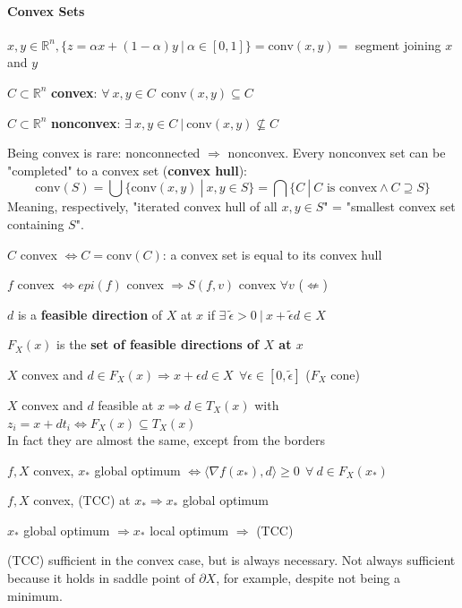 \documentclass[10pt]{report}
\begin{document}
\paragraph{Convex Sets} $x,y\in \mathbb{R}^n,\{z=\alpha x+(1-\alpha)y\:|\:\alpha\in[0,1]\} = \text{conv}(x,y) =$ segment joining $x$ and $y$
\begin{list}{}{}
	\item $C\subset \mathbb{R}^n$ \textbf{convex}: $\forall\:x,y\in C\:\:\text{conv}(x,y)\subseteq C$
	\item $C\subset \mathbb{R}^n$ \textbf{nonconvex}: $\exists\:x,y\in C\:|\:\text{conv}(x,y)\not\subseteq C$
\end{list}
Being convex is rare: nonconnected $\Rightarrow$ nonconvex. Every nonconvex set can be "completed" to a convex set (\textbf{convex hull}):
$$\text{conv}(S) = \bigcup\{\text{conv}(x,y)\:|\:x,y\in S\} = \bigcap\{C\:|\:C\text{ is convex}\wedge C\supseteq S\}$$
Meaning, respectively, "iterated convex hull of all $x,y\in S$" = "smallest convex set containing $S$".\begin{list}{}{}
	\item $C$ convex $\Leftrightarrow C = \text{conv}(C)$: a convex set is equal to its convex hull
	\item $f$ convex $\Leftrightarrow epi(f)$ convex $\Rightarrow S(f,v)$ convex $\forall v$ ($\not\Leftarrow$)
	\item $d$ is a \textbf{feasible direction} of $X$ at $x$ if $\exists\:\tilde{\epsilon}>0\:|\:x+\tilde{\epsilon}d \in X$
	\item $F_X(x)$ is the \textbf{set of feasible directions of $X$ at $x$}
	\item $X$ convex and $d\in F_X(x)\Rightarrow x+\epsilon d\in X\:\:\forall
	\epsilon\in [0,\tilde{\epsilon}]$ ($F_X$ cone)
	\item $X$ convex and $d$ feasible at $x \Rightarrow d\in T_X(x)$ with $z_i = x + dt_i \Leftrightarrow F_X(x)\subseteq T_X(x)$\\
	In fact they are almost the same, except from the borders
	\item $f,X$ convex, $x_*$ global optimum $\Leftrightarrow\langle\nabla f(x_*),d\rangle \geq 0\:\:\forall\:d\in F_X(x_*)$
	\item $f,X$ convex, (TCC) at $x_*\Rightarrow x_*$ global optimum
	\item $x_*$ global optimum $\Rightarrow x_*$ local optimum $\Rightarrow$ (TCC)
\end{list}
(TCC) sufficient in the convex case, but is always necessary. Not always sufficient because it holds in saddle point of $\partial X$, for example, despite not being a minimum.\\
\end{document}

